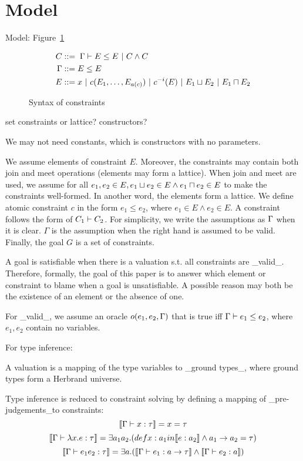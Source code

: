 \section{Model}
\label{sec:model}

Model: Figure~\ref{figure:lang:syntax}

\begin{figure}
\begin{align*}
C &::=\; \Gamma \vdash E \leq E \ |\ C \land C\\
\Gamma &::= E \leq E \\
E &::= x\ |\ c(E_1,\dots,E_{a(c)})\ |\ c^{-i}(E)\ |\ E_1 \sqcup E_2 \
|\ E_1 \sqcap E_2
\end{align*}
\caption{Syntax of constraints}
\label{figure:lang:syntax}
\end{figure}


set constraints or lattice? constructors?

We may not need constants, which is constructors with no parameters.

We assume elements of constraint $E$. Moreover, the constraints may
contain both join and meet operations (elements may form a lattice).
When join and meet are used, we assume for all $e_1, e_2 \in E, e_1
\sqcup e_2 \in E \land e_1 \sqcap e_2 \in E$ to make the constraints
well-formed. In another word, the elements form a lattice. We define
atomic constraint $c$ in the form $e_1 \leq e_2$, where $e_1 \in E
\land e_2 \in E$. A constraint follows the form of $C_1 \vdash C_2$.
For simplicity, we write the assumptions as $\Gamma$ when it is clear.
$\Gamma$ is the assumption when the right hand is assumed to be valid.
Finally, the goal $G$ is a set of constraints. 

A goal is satisfiable when there is a valuation s.t. all constraints
are _valid_. Therefore, formally, the goal of this paper is to answer
which element or constraint to blame when a goal is unsatisfiable. A
possible reason may both be the existence of an element or the absence
of one.

For _valid_, we assume an oracle $o(e_1, e_2, \Gamma)$ that is true iff
$\Gamma \vdash e_1 \leq e_2$, where $e_1, e_2$ contain no variables. 

For type inference:

A valuation is a mapping of the type variables to _ground types_,
where ground types form a Herbrand universe.

Type inference is reduced to constraint solving by defining a mapping
of _pre-judgements_to constraints:
\[\llbracket \Gamma \vdash x:\tau \rrbracket = x =\tau\]
\[\llbracket \Gamma \vdash \lambda x.e:\tau \rrbracket = \exists a_1 a_2.
(def x: a_1 in \llbracket e:a_2 \rrbracket \land a_1 \rightarrow a_2 =\tau)\]
\[\llbracket \Gamma\vdash e_1 e_2 : \tau \rrbracket = \exists a.(\llbracket \Gamma \vdash
e_1:a\rightarrow \tau \rrbracket\land \llbracket \Gamma\vdash e_2:a \rrbracket)\]

